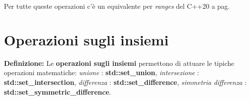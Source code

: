 \fleuron

\textsf{\small Per tutte queste operazioni c'è un equivalente per \emph{ranges} del C++20 a pag. \pageref{ranges}} \\


\newpage

\section{Operazioni sugli insiemi}

\textsf{\small \textbf{Definizione: } Le \textbf{operazioni sugli insiemi} permettono di attuare le tipiche operazioni matematiche: \emph{unione} : \textbf{std::set\_union}, \emph{intersezione} : \textbf{std::set\_intersection}, \emph{differenza} : \textbf{std::set\_difference}, \emph{simmetria differenza} : \textbf{std::set\_symmetric\_difference}.} \\

